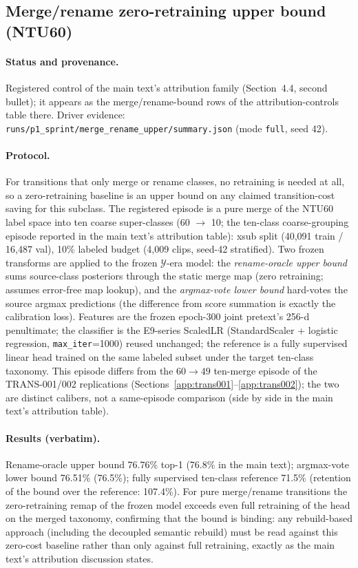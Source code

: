 \documentclass[11pt,a4paper]{article}
\begin{document}
\subsection{Merge/rename zero-retraining upper bound (NTU60)}\label{app:mergebound}

\paragraph{Status and provenance.}
Registered control of the main text's attribution family (Section~4.4, second bullet); it appears as the merge/rename-bound rows of the attribution-controls table there. Driver evidence: \texttt{runs/p1\_sprint/merge\_rename\_upper/summary.json} (mode \texttt{full}, seed 42).

\paragraph{Protocol.}
For transitions that only merge or rename classes, no retraining is needed at all, so a zero-retraining baseline is an upper bound on any claimed transition-cost saving for this subclass. The registered episode is a pure merge of the NTU60 label space into ten coarse super-classes (60 $\to$ 10; the ten-class coarse-grouping episode reported in the main text's attribution table): xsub split (40{,}091 train / 16{,}487 val), 10\% labeled budget (4{,}009 clips, seed-42 stratified). Two frozen transforms are applied to the frozen $\mathcal{Y}$-era model: the \emph{rename-oracle upper bound} sums source-class posteriors through the static merge map (zero retraining; assumes error-free map lookup), and the \emph{argmax-vote lower bound} hard-votes the source argmax predictions (the difference from score summation is exactly the calibration loss). Features are the frozen epoch-300 joint pretext's 256-d penultimate; the classifier is the E9-series ScaledLR (StandardScaler + logistic regression, \texttt{max\_iter}=1000) reused unchanged; the reference is a fully supervised linear head trained on the same labeled subset under the target ten-class taxonomy. This episode differs from the $60\to49$ ten-merge episode of the TRANS-001/002 replications (Sections~\ref{app:trans001}--\ref{app:trans002}); the two are distinct calibers, not a same-episode comparison (side by side in the main text's attribution table).

\paragraph{Results (verbatim).}
Rename-oracle upper bound 76.76\% top-1 (76.8\% in the main text); argmax-vote lower bound 76.51\% (76.5\%); fully supervised ten-class reference 71.5\% (retention of the bound over the reference: 107.4\%). For pure merge/rename transitions the zero-retraining remap of the frozen model exceeds even full retraining of the head on the merged taxonomy, confirming that the bound is binding: any rebuild-based approach (including the decoupled semantic rebuild) must be read against this zero-cost baseline rather than only against full retraining, exactly as the main text's attribution discussion states.
\end{document}

